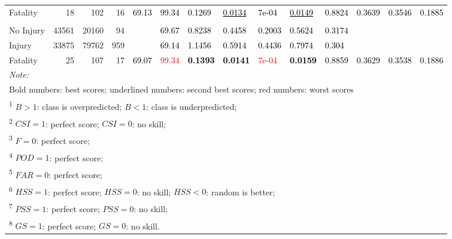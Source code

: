 \documentclass[]{elsarticle} %
\begin{document}
\begin{table}
{{\begin{tabular}[t]{lrrrllllllllll}
Fatality & 18 & 102 & 16 & \multirow{-3}{*}{\raggedright\arraybackslash \textcolor{black}{69.13}} & \textcolor{black}{99.34} & \textcolor{black}{0.1269} & \textcolor{black}{\underline{0.0134}} & \textcolor{black}{7e-04} & \textcolor{black}{\underline{0.0149}} & \textcolor{black}{0.8824} & \multirow{-3}{*}{\raggedright\arraybackslash \textcolor{black}{0.3639}} & \multirow{-3}{*}{\raggedright\arraybackslash \textcolor{black}{0.3546}} & \multirow{-3}{*}{\raggedright\arraybackslash \textcolor{black}{0.1885}}\\
\cmidrule{1-14}
\addlinespace[0.3em]
\multicolumn{14}{l}{\textbf{Model 4 Ensemble}}\\
\hspace{1em}No Injury & 43561 & 20160 & 94 &  & \textcolor{black}{69.67} & \textcolor{black}{0.8238} & \textcolor{black}{0.4458} & \textcolor{black}{0.2003} & \textcolor{black}{0.5624} & \textcolor{black}{0.3174} &  &  & \\

\hspace{1em}Injury & 33875 & 79762 & 959 &  & \textcolor{black}{69.14} & \textcolor{black}{1.1456} & \textcolor{black}{0.5914} & \textcolor{black}{0.4436} & \textcolor{black}{0.7974} & \textcolor{black}{0.304} &  &  & \\

Fatality & 25 & 107 & 17 & \multirow{-3}{*}{\raggedright\arraybackslash \textcolor{black}{69.07}} & \textcolor{red}{99.34} & \textcolor{black}{\textbf{0.1393}} & \textcolor{black}{\textbf{0.0141}} & \textcolor{red}{7e-04} & \textcolor{black}{\textbf{0.0159}} & \textcolor{black}{0.8859} & \multirow{-3}{*}{\raggedright\arraybackslash \textcolor{black}{0.3629}} & \multirow{-3}{*}{\raggedright\arraybackslash \textcolor{black}{0.3538}} & \multirow{-3}{*}{\raggedright\arraybackslash \textcolor{black}{0.1886}}\\
\bottomrule
\multicolumn{14}{l}{\textit{Note: }}\\
\multicolumn{14}{l}{Bold numbers: best scores; underlined numbers: second best scores; red numbers: worst scores}\\
\multicolumn{14}{l}{\textsuperscript{1} $B>1$: class is overpredicted; $B<1$: class is underpredicted; }\\
\multicolumn{14}{l}{\textsuperscript{2} $CSI = 1$: perfect score; $CSI = 0$: no skill; }\\
\multicolumn{14}{l}{\textsuperscript{3} $F = 0$: perfect score; }\\
\multicolumn{14}{l}{\textsuperscript{4} $POD = 1$: perfect score; }\\
\multicolumn{14}{l}{\textsuperscript{5} $FAR = 0$: perfect score; }\\
\multicolumn{14}{l}{\textsuperscript{6} $HSS = 1$: perfect score; $HSS = 0$: no skill; $HSS < 0$: random is better; }\\
\multicolumn{14}{l}{\textsuperscript{7} $PSS = 1$: perfect score; $PSS = 0$: no skill; }\\
\multicolumn{14}{l}{\textsuperscript{8} $GS = 1$: perfect score; $GS = 0$: no skill.}\\
\end{tabular}}}
\end{table}
\end{document}
